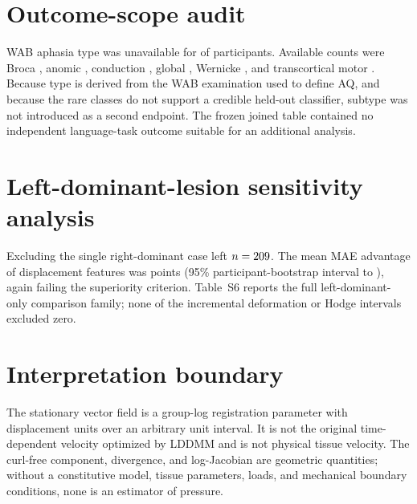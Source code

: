 \documentclass[11pt]{article}
\begin{document}
\section{Outcome-scope audit}

WAB aphasia type was unavailable for \WABTypeMissingN{} of \AnalysisN{}
participants. Available counts were Broca \WABTypeBrocaN{}, anomic
\WABTypeAnomicN{}, conduction \WABTypeConductionN{}, global
\WABTypeGlobalN{}, Wernicke \WABTypeWernickeN{}, and transcortical motor
\WABTypeTranscorticalMotorN{}. Because type is derived from the WAB examination
used to define AQ, and because the rare classes do not support a credible
held-out classifier, subtype was not introduced as a second endpoint. The
frozen joined table contained no independent language-task outcome suitable
for an additional analysis.

\section{Left-dominant-lesion sensitivity analysis}

Excluding the single right-dominant case left $n=209$. The mean MAE
advantage of displacement features was \LeftOnlyDeformationAdvantage{} points
(95\% participant-bootstrap interval \LeftOnlyDeformationCILow{} to
\LeftOnlyDeformationCIHigh{}), again failing the superiority criterion.
Table~S6 reports the full left-dominant-only comparison family; none of the
incremental deformation or Hodge intervals excluded zero.

\begin{table}[ht]
\centering
\caption{Paired MAE comparisons after excluding the single right-dominant
lesion case.}
\label{tab:left-only-comparisons}
\scriptsize
\resizebox{\textwidth}{!}{}
\end{table}

\section{Interpretation boundary}

The stationary vector field is a group-log registration parameter with
displacement units over an arbitrary unit interval. It is not the original
time-dependent velocity optimized by LDDMM and is not physical tissue velocity.
The curl-free component, divergence, and log-Jacobian are geometric quantities;
without a constitutive model, tissue parameters, loads, and mechanical boundary
conditions, none is an estimator of pressure.
\end{document}
